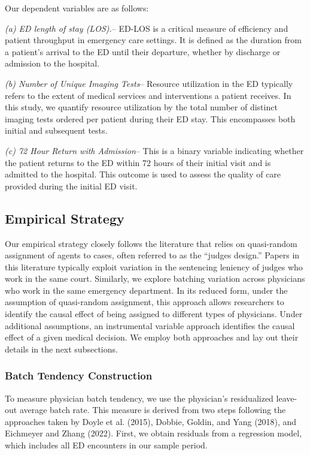 \documentclass{article}
\begin{document}
Our dependent variables are as follows:

\emph{(a) ED length of stay (LOS).}-- ED-LOS is a critical measure of
efficiency and patient throughput in emergency care settings. It is
defined as the duration from a patient's arrival to the ED until their
departure, whether by discharge or admission to the hospital.

\emph{(b) Number of Unique Imaging Tests}-- Resource utilization in the
ED typically refers to the extent of medical services and interventions
a patient receives. In this study, we quantify resource utilization by
the total number of distinct imaging tests ordered per patient during
their ED stay. This encompasses both initial and subsequent tests.

\emph{(c) 72 Hour Return with Admission}-- This is a binary variable
indicating whether the patient returns to the ED within 72 hours of
their initial visit and is admitted to the hospital. This outcome is
used to assess the quality of care provided during the initial ED visit.

\hypertarget{empirical-strategy}{%
\subsection{Empirical Strategy}\label{empirical-strategy}}

Our empirical strategy closely follows the literature that relies on
quasi-random assignment of agents to cases, often referred to as the
``judges design.'' Papers in this literature typically exploit variation
in the sentencing leniency of judges who work in the same court.
Similarly, we explore batching variation across physicians who work in
the same emergency department. In its reduced form, under the assumption
of quasi-random assignment, this approach allows researchers to identify
the causal effect of being assigned to different types of physicians.
Under additional assumptions, an instrumental variable approach
identifies the causal effect of a given medical decision. We employ both
approaches and lay out their details in the next subsections.

\hypertarget{batch-tendency-construction}{%
\subsubsection{Batch Tendency
Construction}\label{batch-tendency-construction}}

To measure physician batch tendency, we use the physician's residualized
leave-out average batch rate. This measure is derived from two steps
following the approaches taken by Doyle et al. (2015), Dobbie, Goldin,
and Yang (2018), and Eichmeyer and Zhang (2022). First, we obtain
residuals from a regression model, which includes all ED encounters in
our sample period.
\end{document}
